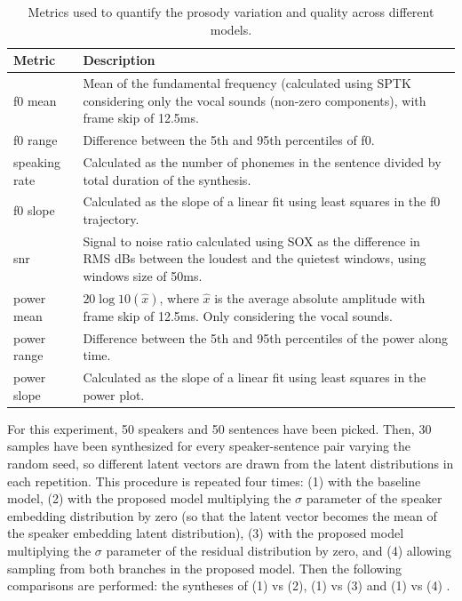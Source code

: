 \begin{table}[h!]
	\scriptsize
		\centering
	\caption[Summary of prosody variability metrics for TTS models]{Metrics used to quantify the prosody variation and quality across different models.}
	\begin{tabular}{p{}|p{}}
		\toprule
		Metric & Description \\
		\midrule
		f0 mean &  Mean of the fundamental frequency (calculated using SPTK \autocite{sptk} considering only the vocal sounds (non-zero components), with frame skip of 12.5ms.\\
		f0 range & Difference between the 5th and 95th percentiles of f0. \\
		speaking rate & Calculated as the number of phonemes in the sentence divided by total duration of the synthesis. \\
		f0 slope & Calculated as the slope of a linear fit using least squares in the f0 trajectory. \\
		snr & Signal to noise ratio calculated using SOX \autocite{SOX} as the difference in RMS dBs between the loudest and the quietest windows, using windows size of 50ms. \\
		power mean & $20\log10(\hat{x})$, where $\hat{x}$ is the average absolute amplitude with frame skip of 12.5ms. Only considering the vocal sounds. \\
		power range & Difference between the 5th and 95th percentiles of the power along time. \\
		power slope & Calculated as the slope of a linear fit using least squares in the power plot. \\
		\bottomrule
	\end{tabular}
	\label{tab:metrics}
\end{table}



For this experiment, 50 speakers and 50 sentences have been picked. Then, 30 samples have been synthesized for every speaker-sentence pair varying the random seed, so different latent vectors are drawn from the latent distributions in each repetition. This procedure is repeated four times: (1) with the baseline model, (2) with the proposed model multiplying the $\sigma$ parameter of the speaker embedding distribution by zero (so that the latent vector becomes the mean of the speaker embedding latent distribution), (3) with the proposed model multiplying the $\sigma$ parameter of the residual distribution by zero, and (4) allowing sampling from both branches in the proposed model. Then the following comparisons are performed: the syntheses of (1) vs (2), (1) vs (3) and (1) vs (4) .

